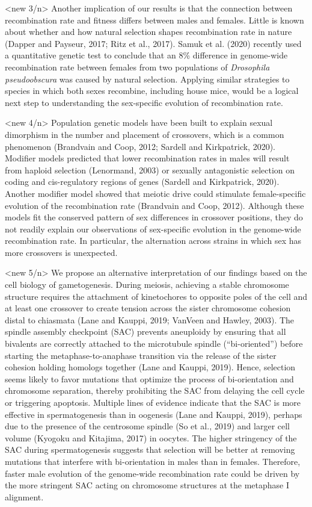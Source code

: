 \documentclass[
]{article}
\begin{document}
\textless new 3/n\textgreater{} Another implication of our results is
that the connection between recombination rate and fitness differs
between males and females. Little is known about whether and how natural
selection shapes recombination rate in nature (Dapper and Payseur, 2017;
Ritz et al., 2017). Samuk et al. (2020) recently used a quantitative
genetic test to conclude that an 8\% difference in genome-wide
recombination rate between females from two populations of
\emph{Drosophila pseudoobscura} was caused by natural selection.
Applying similar strategies to species in which both sexes recombine,
including house mice, would be a logical next step to understanding the
sex-specific evolution of recombination rate.

\textless new 4/n\textgreater{} Population genetic models have been
built to explain sexual dimorphism in the number and placement of
crossovers, which is a common phenomenon (Brandvain and Coop, 2012;
Sardell and Kirkpatrick, 2020). Modifier models predicted that lower
recombination rates in males will result from haploid selection
(Lenormand, 2003) or sexually antagonistic selection on coding and
cis-regulatory regions of genes (Sardell and Kirkpatrick, 2020). Another
modifier model showed that meiotic drive could stimulate female-specific
evolution of the recombination rate (Brandvain and Coop, 2012). Although
these models fit the conserved pattern of sex differences in crossover
positions, they do not readily explain our observations of sex-specific
evolution in the genome-wide recombination rate. In particular, the
alternation across strains in which sex has more crossovers is
unexpected.

\textless new 5/n\textgreater{} We propose an alternative interpretation
of our findings based on the cell biology of gametogenesis. During
meiosis, achieving a stable chromosome structure requires the attachment
of kinetochores to opposite poles of the cell and at least one crossover
to create tension across the sister chromosome cohesion distal to
chiasmata (Lane and Kauppi, 2019; VanVeen and Hawley, 2003). The spindle
assembly checkpoint (SAC) prevents aneuploidy by ensuring that all
bivalents are correctly attached to the microtubule spindle
(``bi-oriented'') before starting the metaphase-to-anaphase transition
via the release of the sister cohesion holding homologs together (Lane
and Kauppi, 2019). Hence, selection seems likely to favor mutations that
optimize the process of bi-orientation and chromosome separation,
thereby prohibiting the SAC from delaying the cell cycle or triggering
apoptosis. Multiple lines of evidence indicate that the SAC is more
effective in spermatogenesis than in oogenesis (Lane and Kauppi, 2019),
perhaps due to the presence of the centrosome spindle (So et al., 2019)
and larger cell volume (Kyogoku and Kitajima, 2017) in oocytes. The
higher stringency of the SAC during spermatogenesis suggests that
selection will be better at removing mutations that interfere with
bi-orientation in males than in females. Therefore, faster male
evolution of the genome-wide recombination rate could be driven by the
more stringent SAC acting on chromosome structures at the metaphase I
alignment.
\end{document}
